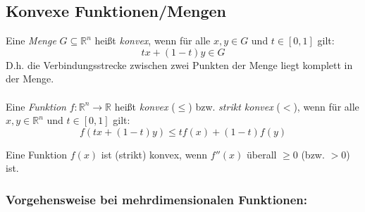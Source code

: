 \subsection{Konvexe Funktionen/Mengen}


Eine \emph{Menge} $G \subseteq \mathbb{R}^n$ heißt \emph{konvex}, wenn für alle $x, y \in G$ und $t \in [0, 1]$ gilt:
\begin{equation*}
t x + (1 - t) y \in G
\end{equation*}
D.h. die Verbindungsstrecke zwischen zwei Punkten der Menge liegt komplett in der Menge.
\\
\\
Eine \emph{Funktion} $f: \mathbb{R}^n \rightarrow \mathbb{R}$ heißt \emph{konvex} (\(\leq\)) bzw. \emph{strikt konvex} (\(<\)), wenn für alle $x, y \in \mathbb{R}^n$ und $t \in [0, 1]$ gilt:
\begin{equation*}
    f(t x + (1 - t) y) \leq t f(x) + (1 - t) f(y)
\end{equation*}

Eine Funktion \(f(x)\) ist (strikt) konvex, wenn \(f''(x)\) überall \(\geq 0\) (bzw. \(> 0\)) ist.

\subsubsection{Vorgehensweise bei mehrdimensionalen Funktionen:}

